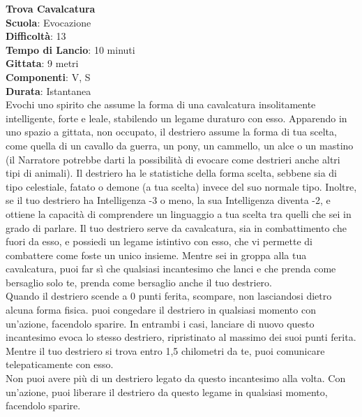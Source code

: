\begin{multicols}{2}
\medskip\textbf{Trova Cavalcatura}\\
\textbf{Scuola}: Evocazione\\
\textbf{Difficoltà}:  13\\
\textbf{Tempo di Lancio}: 10 minuti\\
\textbf{Gittata}: 9 metri\\
\textbf{Componenti}: V, S\\
\textbf{Durata}: Istantanea\\
Evochi uno spirito che assume la forma di una cavalcatura insolitamente intelligente, forte e leale, stabilendo un legame duraturo con esso. Apparendo in uno spazio a gittata, non occupato, il destriero assume la forma di tua scelta, come quella di un cavallo da guerra, un pony, un cammello, un alce o un mastino (il Narratore potrebbe darti la possibilità di evocare come destrieri anche altri tipi di animali). Il destriero ha le statistiche della forma scelta, sebbene sia di tipo celestiale, fatato o demone (a tua scelta) invece del suo normale tipo. Inoltre, se il tuo destriero ha Intelligenza -3 o meno, la sua Intelligenza diventa -2, e ottiene la capacità di comprendere un linguaggio a tua scelta tra quelli che sei in grado di parlare. Il tuo destriero serve da cavalcatura, sia in combattimento che fuori da esso, e possiedi un legame istintivo con esso, che vi permette di combattere come foste un unico insieme. Mentre sei in groppa alla tua cavalcatura, puoi far sì che qualsiasi incantesimo che lanci e che prenda come bersaglio solo te, prenda come bersaglio anche il tuo destriero.\\
Quando il destriero scende a 0 punti ferita, scompare, non lasciandosi dietro alcuna forma fisica. puoi congedare il destriero in qualsiasi momento con un'azione, facendolo sparire. In entrambi i casi, lanciare di nuovo questo incantesimo evoca lo stesso destriero, ripristinato al massimo dei suoi punti ferita. Mentre il tuo destriero si trova entro 1,5 chilometri da te, puoi comunicare telepaticamente con esso.\\
Non puoi avere più di un destriero legato da questo incantesimo alla volta. Con un'azione, puoi liberare il destriero da questo legame in qualsiasi momento, facendolo sparire.


\end{multicols}
